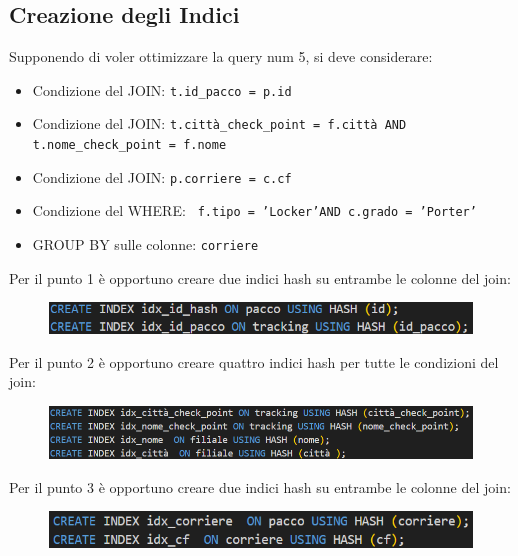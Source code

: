 \subsection{Creazione degli Indici} 

Supponendo di voler ottimizzare la query num 5, si deve considerare:

\begin{itemize}
  \item Condizione del JOIN: \texttt{t.id\_pacco = p.id}
  \item Condizione del JOIN: \texttt{t.città\_check\_point = f.città AND t.nome\_check\_point = f.nome}
  \item Condizione del JOIN: \texttt{p.corriere = c.cf}
  \item Condizione del WHERE: \texttt{ f.tipo = 'Locker'AND c.grado = 'Porter'}
  \item GROUP BY sulle colonne: \texttt{corriere}
\end{itemize}


\noindent Per il punto 1 è opportuno creare due indici hash su entrambe le colonne del join:
\begin{figure}[H]
\centering
\includegraphics[width=1 \textwidth]{Resources/INDEX1.png}
\label{ML}
\end{figure}

\noindent Per il punto 2 è opportuno creare quattro indici hash per tutte le condizioni del join:
\begin{figure}[H]
\centering
\includegraphics[width=1 \textwidth]{Resources/INDEX2.png}
\label{ML}
\end{figure}

\noindent Per il punto 3 è opportuno creare due indici hash su entrambe le colonne del join:

\begin{figure}[H]
\centering
\includegraphics[width=1 \textwidth]{Resources/INDEX3.png}
\label{ML}
\end{figure}

